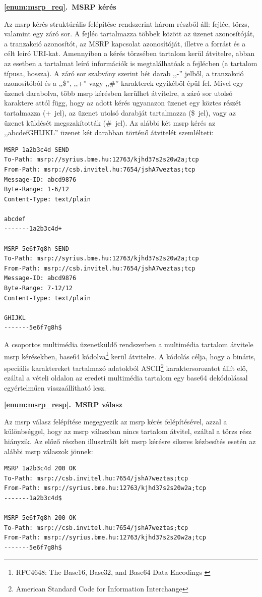 \noindent
{\bf \ref{enum:msrp_req}.~MSRP kérés}

Az msrp kérés struktúrális felépítése rendszerint három részből áll: fejléc, törzs, valamint egy záró sor. A fejléc tartalmazza többek között az üzenet azonosítóját, a tranzakció azonosítót, az MSRP kapcsolat azonosítóját, illetve a forrást és a célt leíró URI-kat. Amennyiben a kérés törzsében tartalom kerül átvitelre, abban az esetben a tartalmat leíró információk is megtalálhatóak a fejlécben (a tartalom típusa, hossza). A záró sor szabvány szerint hét darab ,,-'' jelből, a tranzakció azonosítóból és a ,,\$'', ,,+'' vagy ,,\#'' karakterek egyikéből épül fel. Mivel egy üzenet darabolva, több msrp kérésben kerülhet átvitelre, a záró sor utolsó karaktere attól függ, hogy az adott kérés ugyanazon üzenet egy köztes részét tartalmazza (+~jel), az üzenet utolsó darabját tartalmazza (\$~jel), vagy az üzenet küldését megszakították (\#~jel). Az alábbi két msrp kérés az ,,abcdefGHIJKL'' üzenet két darabban történő átvitelét szemlélteti:

\fontsize{10}{10}
\begin{verbatim}
MSRP 1a2b3c4d SEND
To-Path: msrp://syrius.bme.hu:12763/kjhd37s2s20w2a;tcp
From-Path: msrp://csb.invitel.hu:7654/jshA7weztas;tcp
Message-ID: abcd9876
Byte-Range: 1-6/12
Content-Type: text/plain

abcdef
-------1a2b3c4d+

MSRP 5e6f7g8h SEND
To-Path: msrp://syrius.bme.hu:12763/kjhd37s2s20w2a;tcp
From-Path: msrp://csb.invitel.hu:7654/jshA7weztas;tcp
Message-ID: abcd9876
Byte-Range: 7-12/12
Content-Type: text/plain

GHIJKL
-------5e6f7g8h$
\end{verbatim}
\fontsize{12}{12} 

A csoportos multimédia üzenetküldő rendszerben a multimédia tartalom átvitele msrp kérésekben, base64 kódolva\footnote{RFC4648: The Base16, Base32, and Base64 Data Encodings \cite{rfc4648}} kerül átvitelre. A kódolás célja, hogy a bináris, speciális karaktereket tartalmazó adatokból ASCII\footnote{American Standard Code for Information Interchange} karaktersorozatot állít elő, ezáltal a vételi oldalon az eredeti multimédia tartalom egy base64 dekódolással egyértelműen visszaállítható lesz.
\bigskip

\noindent
{\bf \ref{enum:msrp_resp}.~MSRP válasz}

Az msrp válasz felépítése megegyezik az msrp kérés felépítésével, azzal a különbséggel, hogy az msrp válaszban nincs tartalom átvitel, ezáltal a törzs rész hiányzik. Az előző részben illusztrált két msrp kérésre sikeres kézbesítés esetén az alábbi msrp válaszok jönnek:
\fontsize{10}{10}
\begin{verbatim}
MSRP 1a2b3c4d 200 OK
To-Path: msrp://csb.invitel.hu:7654/jshA7weztas;tcp
From-Path: msrp://syrius.bme.hu:12763/kjhd37s2s20w2a;tcp
-------1a2b3c4d$

MSRP 5e6f7g8h 200 OK
To-Path: msrp://csb.invitel.hu:7654/jshA7weztas;tcp
From-Path: msrp://syrius.bme.hu:12763/kjhd37s2s20w2a;tcp
-------5e6f7g8h$
\end{verbatim}
\fontsize{12}{12} 

